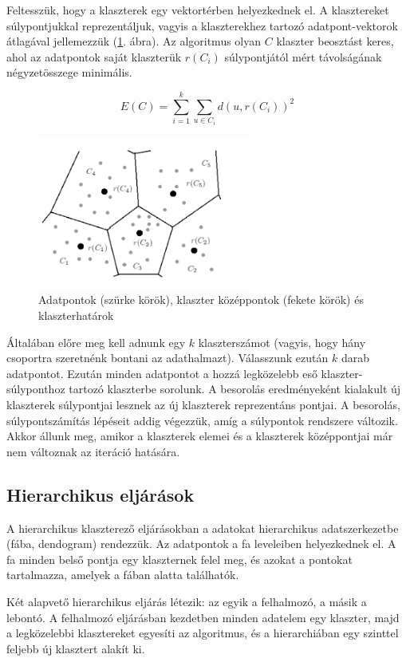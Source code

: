 \documentclass[a4paper,12pt]{article}
\begin{document}
Feltesszük, hogy a klaszterek egy vektortérben helyezkednek el. A klasztereket
súlypontjukkal reprezentáljuk, vagyis a klaszterekhez tartozó adatpont-vektorok
átlagával jellemezzük (\ref{fig:klaszterek}. ábra). Az algoritmus olyan $C$
klaszter beosztást keres, ahol az adatpontok saját klaszterük $r(C_i)$
súlypontjától mért távolságának négyzetösszege minimális.

$$E(C) = \sum_{i=1}^ k \sum_{u \in C_i} d(u,r(C_i))^2$$


\begin{figure}
	\centering
	\includegraphics[width=7cm]{klaszterek.png}
	\caption{Adatpontok (szürke körök), klaszter középpontok (fekete körök) és klaszterhatárok}
	\label{fig:klaszterek}
\end{figure}

Általában előre meg kell adnunk egy $k$ klaszterszámot (vagyis, hogy hány
csoportra szeretnénk bontani az adathalmazt).  Válasszunk ezután $k$ darab
adatpontot. Ezután minden adatpontot a hozzá legközelebb eső
klaszter-súlyponthoz tartozó klaszterbe sorolunk. A besorolás eredményeként
kialakult új klaszterek súlypontjai lesznek az új klaszterek reprezentáns
pontjai. A besorolás, súlypontszámítás lépéseit addig végezzük, amíg a
súlypontok rendszere változik. Akkor állunk meg, amikor a klaszterek elemei és a
klaszterek középpontjai már nem változnak az iteráció hatására.

\subsection{Hierarchikus eljárások}

A hierarchikus klaszterező eljárásokban a adatokat hierarchikus adatszerkezetbe
(fába, dendogram) rendezzük. Az adatpontok a fa leveleiben helyezkednek el. A fa
minden belső pontja egy klaszternek felel meg, és azokat a pontokat tartalmazza,
amelyek a fában alatta találhatók.

Két alapvető hierarchikus eljárás létezik: az egyik a felhalmozó, a másik a
lebontó. A felhalmozó eljárásban kezdetben minden adatelem egy klaszter, majd a
legközelebbi klasztereket egyesíti az algoritmus, és a hierarchiában egy
szinttel feljebb új klasztert alakít ki.
\end{document}
